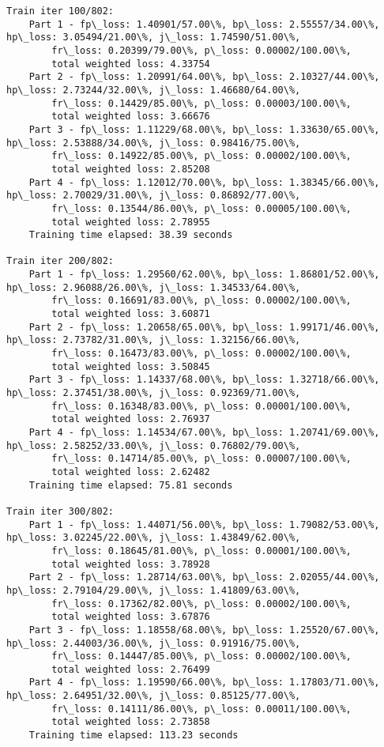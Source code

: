 \documentclass[11pt]{article}
\begin{document}
\begin{Verbatim}[commandchars=\\\{\}]
Train iter 100/802:
	Part 1 - fp\_loss: 1.40901/57.00\%, bp\_loss: 2.55557/34.00\%, hp\_loss: 3.05494/21.00\%, j\_loss: 1.74590/51.00\%, 
		fr\_loss: 0.20399/79.00\%, p\_loss: 0.00002/100.00\%, 
		total weighted loss: 4.33754
	Part 2 - fp\_loss: 1.20991/64.00\%, bp\_loss: 2.10327/44.00\%, hp\_loss: 2.73244/32.00\%, j\_loss: 1.46680/64.00\%, 
		fr\_loss: 0.14429/85.00\%, p\_loss: 0.00003/100.00\%, 
		total weighted loss: 3.66676
	Part 3 - fp\_loss: 1.11229/68.00\%, bp\_loss: 1.33630/65.00\%, hp\_loss: 2.53888/34.00\%, j\_loss: 0.98416/75.00\%, 
		fr\_loss: 0.14922/85.00\%, p\_loss: 0.00002/100.00\%, 
		total weighted loss: 2.85208
	Part 4 - fp\_loss: 1.12012/70.00\%, bp\_loss: 1.38345/66.00\%, hp\_loss: 2.70029/31.00\%, j\_loss: 0.86892/77.00\%, 
		fr\_loss: 0.13544/86.00\%, p\_loss: 0.00005/100.00\%, 
		total weighted loss: 2.78955
	Training time elapsed: 38.39 seconds

Train iter 200/802:
	Part 1 - fp\_loss: 1.29560/62.00\%, bp\_loss: 1.86801/52.00\%, hp\_loss: 2.96088/26.00\%, j\_loss: 1.34533/64.00\%, 
		fr\_loss: 0.16691/83.00\%, p\_loss: 0.00002/100.00\%, 
		total weighted loss: 3.60871
	Part 2 - fp\_loss: 1.20658/65.00\%, bp\_loss: 1.99171/46.00\%, hp\_loss: 2.73782/31.00\%, j\_loss: 1.32156/66.00\%, 
		fr\_loss: 0.16473/83.00\%, p\_loss: 0.00002/100.00\%, 
		total weighted loss: 3.50845
	Part 3 - fp\_loss: 1.14337/68.00\%, bp\_loss: 1.32718/66.00\%, hp\_loss: 2.37451/38.00\%, j\_loss: 0.92369/71.00\%, 
		fr\_loss: 0.16348/83.00\%, p\_loss: 0.00001/100.00\%, 
		total weighted loss: 2.76937
	Part 4 - fp\_loss: 1.14534/67.00\%, bp\_loss: 1.20741/69.00\%, hp\_loss: 2.58252/33.00\%, j\_loss: 0.76802/79.00\%, 
		fr\_loss: 0.14714/85.00\%, p\_loss: 0.00007/100.00\%, 
		total weighted loss: 2.62482
	Training time elapsed: 75.81 seconds

Train iter 300/802:
	Part 1 - fp\_loss: 1.44071/56.00\%, bp\_loss: 1.79082/53.00\%, hp\_loss: 3.02245/22.00\%, j\_loss: 1.43849/62.00\%, 
		fr\_loss: 0.18645/81.00\%, p\_loss: 0.00001/100.00\%, 
		total weighted loss: 3.78928
	Part 2 - fp\_loss: 1.28714/63.00\%, bp\_loss: 2.02055/44.00\%, hp\_loss: 2.79104/29.00\%, j\_loss: 1.41809/63.00\%, 
		fr\_loss: 0.17362/82.00\%, p\_loss: 0.00002/100.00\%, 
		total weighted loss: 3.67876
	Part 3 - fp\_loss: 1.18558/68.00\%, bp\_loss: 1.25520/67.00\%, hp\_loss: 2.44003/36.00\%, j\_loss: 0.91916/75.00\%, 
		fr\_loss: 0.14447/85.00\%, p\_loss: 0.00002/100.00\%, 
		total weighted loss: 2.76499
	Part 4 - fp\_loss: 1.19590/66.00\%, bp\_loss: 1.17803/71.00\%, hp\_loss: 2.64951/32.00\%, j\_loss: 0.85125/77.00\%, 
		fr\_loss: 0.14111/86.00\%, p\_loss: 0.00011/100.00\%, 
		total weighted loss: 2.73858
	Training time elapsed: 113.23 seconds


\end{Verbatim}
\end{document}
